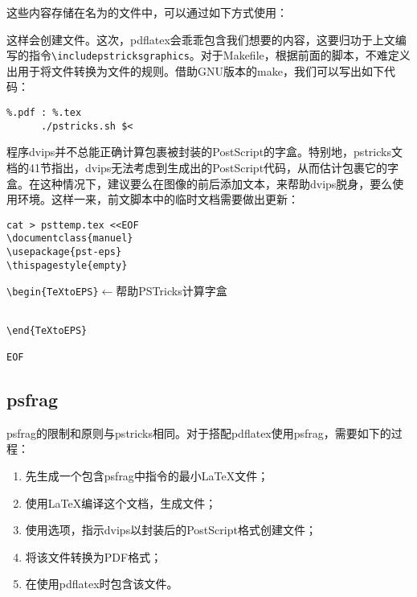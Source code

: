 这些内容存储在名为的文件中，可以通过如下方式使用：


这样会创建文件。这次，\textsf{pdflatex}会乖乖包含我们想要的内容，这要归功于上文编写的指令\verb+\includepstricksgraphics+。对于Makefile，根据前面的脚本，不难定义出用于将文件转换为文件的规则。借助GNU版本的\textsf{make}，我们可以写出如下代码：

\begin{dmd}
\begin{verbatim}
%.pdf : %.tex
      ./pstricks.sh $<
\end{verbatim}
\end{dmd}

\begin{qquestion}
程序dvips并不总能正确计算包裹被封装的PostScript的字盒。特别地，pstricks文档的41节指出，dvips无法考虑到生成出的PostScript代码，从而估计包裹它的字盒。在这种情况下，建议要么在图像的前后添加文本，来帮助dvips脱身，要么使用环境。这样一来，前文脚本中的临时文档需要做出更新：

\begin{dmd}
\begin{verbatim}
cat > psttemp.tex <<EOF
\documentclass{manuel}
\usepackage{pst-eps}
\thispagestyle{empty}

\end{verbatim}
\verb+\begin{TeXtoEPS}+\quad$\leftarrow$\textsf{帮助PSTricks计算字盒}
\begin{verbatim}

\end{TeXtoEPS}

EOF
\end{verbatim}
\end{dmd}
\end{qquestion}

\subsection{\textsf{psfrag}}

\textsf{psfrag}的限制和原则与\textsf{pstricks}相同。对于搭配\textsf{pdflatex}使用\textsf{psfrag}，需要如下的过程：

\begin{enumerate}
    \item 先生成一个包含\textsf{psfrag}中指令的最小\LaTeX 文件；
    \item 使用\LaTeX 编译这个文档，生成文件；
    \item 使用选项，指示\textsf{dvips}以封装后的PostScript格式创建文件；
    \item 将该文件转换为PDF格式；
    \item 在使用\textsf{pdflatex}时包含该文件。
\end{enumerate}

